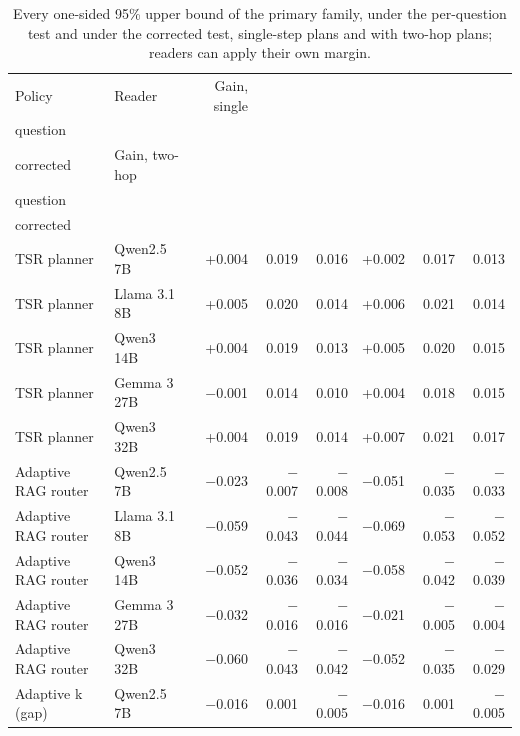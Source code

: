 \begin{table}[t]
\centering\small
\setlength{\tabcolsep}{4pt}
\caption{Every one-sided 95\% upper bound of the primary family, under the per-question test and under the corrected test, single-step plans and with two-hop plans; readers can apply their own margin.}
\label{tab:rev2_bounds}
\begin{tabular*}{\linewidth}{@{\extracolsep{\fill}}llrrrrrr}
\toprule
Policy & Reader & Gain, single & \begin{tabular}[b]{@{}r@{}}Bound, per \\ question\end{tabular} & \begin{tabular}[b]{@{}r@{}}Bound, \\ corrected\end{tabular} & Gain, two-hop & \begin{tabular}[b]{@{}r@{}}Bound, per \\ question \end{tabular} & \begin{tabular}[b]{@{}r@{}}Bound, \\ corrected \end{tabular} \\
\midrule
TSR planner & Qwen2.5 7B & +0.004 & 0.019 & 0.016 & +0.002 & 0.017 & 0.013 \\
TSR planner & Llama 3.1 8B & +0.005 & 0.020 & 0.014 & +0.006 & 0.021 & 0.014 \\
TSR planner & Qwen3 14B & +0.004 & 0.019 & 0.013 & +0.005 & 0.020 & 0.015 \\
TSR planner & Gemma 3 27B & $-$0.001 & 0.014 & 0.010 & +0.004 & 0.018 & 0.015 \\
TSR planner & Qwen3 32B & +0.004 & 0.019 & 0.014 & +0.007 & 0.021 & 0.017 \\
Adaptive RAG router & Qwen2.5 7B & $-$0.023 & $-$0.007 & $-$0.008 & $-$0.051 & $-$0.035 & $-$0.033 \\
Adaptive RAG router & Llama 3.1 8B & $-$0.059 & $-$0.043 & $-$0.044 & $-$0.069 & $-$0.053 & $-$0.052 \\
Adaptive RAG router & Qwen3 14B & $-$0.052 & $-$0.036 & $-$0.034 & $-$0.058 & $-$0.042 & $-$0.039 \\
Adaptive RAG router & Gemma 3 27B & $-$0.032 & $-$0.016 & $-$0.016 & $-$0.021 & $-$0.005 & $-$0.004 \\
Adaptive RAG router & Qwen3 32B & $-$0.060 & $-$0.043 & $-$0.042 & $-$0.052 & $-$0.035 & $-$0.029 \\
Adaptive k (gap) & Qwen2.5 7B & $-$0.016 & 0.001 & $-$0.005 & $-$0.016 & 0.001 & $-$0.005 \\

\end{tabular*}
\end{table}
